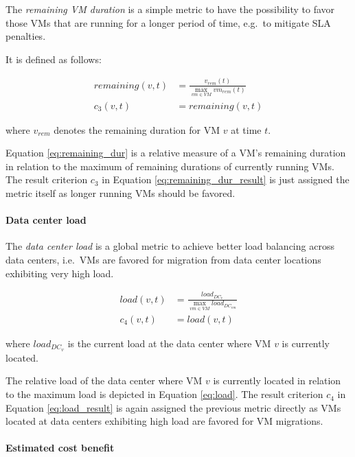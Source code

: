 The \textit{remaining VM duration} is a simple metric to have the possibility to favor those VMs that are running for a longer period of time, e.g.~to mitigate SLA penalties. 

It is defined as follows: 

\begin{align}
	remaining(v,t) &= \frac{v_{rem}(t)}{\max_{vm \in VM} vm_{rem}(t)} \label{eq:remaining_dur} \\
	c_3 (v,t) &= remaining(v,t) \label{eq:remaining_dur_result}
\end{align}

where $v_{rem}$ denotes the remaining duration for VM $v$ at time $t$. 

Equation \ref{eq:remaining_dur} is a relative measure of a VM's remaining duration in relation to the maximum of remaining durations of currently running VMs. The result criterion $c_3$ in Equation \ref{eq:remaining_dur_result} is just assigned the metric itself as longer running VMs should be favored. 


\paragraph{Data center load}

The \textit{data center load} is a global metric to achieve better load balancing across data centers, i.e.~VMs are favored for migration from data center locations exhibiting very high load. 

\begin{align}
	load(v,t) &= \frac{load_{DC_v}}{\max_{vm \in VM} load_{DC_{vm}}} \label{eq:load}\\
	c_4 (v,t) &= load(v,t) \label{eq:load_result}
\end{align}

where ${load_{DC_v}}$ is the current load at the data center where VM $v$ is currently located. 

The relative load of the data center where VM $v$ is currently located in relation to the maximum load is depicted in Equation \ref{eq:load}. The result criterion $c_4$ in Equation \ref{eq:load_result} is again assigned the previous metric directly as VMs located at data centers exhibiting high load are favored for VM migrations. 



\paragraph{Estimated cost benefit}

